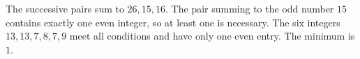 The successive pairs sum to $26,15,16$. The pair summing to the odd number $15$ contains exactly one even integer, so at least one is necessary. The six integers $13,13,7,8,7,9$ meet all conditions and have only one even entry. The minimum is $\boxed1$.
